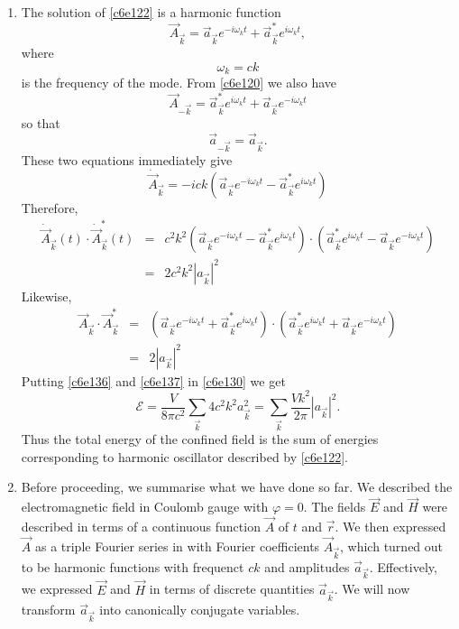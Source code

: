 \begin{enumerate}
\item The solution of \eqref{c6e122} is a harmonic function
\begin{equation}\label{c6e131}
\vec{A}_{\vec{k}} = \vec{a}_{\vec{k}}e^{-i\omega_k t} + \vec{a}_{\vec{k}}^\ast e^{i\omega_k t},
\end{equation}
where
\begin{equation}\label{c6e132}
\omega_k = ck
\end{equation}
is the frequency of the mode. From \eqref{c6e120} we also have
\begin{equation}\label{c6e133}
\vec{A}_{-\vec{k}} = \vec{a}_{\vec{k}}^\ast e^{i\omega_k t} + \vec{a}_{\vec{k}} e^{-i\omega_k t}
\end{equation}
so that
\begin{equation}\label{c6e134}
\vec{a}_{-\vec{k}} = \vec{a}_{\vec{k}}.
\end{equation}
These two equations immediately give
\begin{equation}\label{c6e135}
\dot{\vec{A}}_{\vec{k}} = -ick(\vec{a}_{\vec{k}}e^{-i\omega_k t} - \vec{a}_{\vec{k}}^\ast e^{i\omega_k t})
\end{equation}
Therefore,
\begin{eqnarray}
\dot{\vec{A}}_{\vec{k}}(t)\cdot\dot{\vec{A}}_{\vec{k}}^\ast(t) &=& c^2k^2
(\vec{a}_{\vec{k}}e^{-i\omega_k t} - \vec{a}_{\vec{k}}^\ast e^{i\omega_k t})\cdot
(\vec{a}_{\vec{k}}^\ast e^{i\omega_k t} - \vec{a}_{\vec{k}} e^{-i\omega_k t}) \nonumber \\
&=& 2c^2k^2|a_{\vec{k}}|^2 \label{c6e136}
\end{eqnarray}
Likewise,
\begin{eqnarray}
\vec{A}_{\vec{k}}\cdot\vec{A}_{\vec{k}}^\ast &=& 
(\vec{a}_{\vec{k}}e^{-i\omega_k t} + \vec{a}_{\vec{k}}^\ast e^{i\omega_k t})\cdot
(\vec{a}_{\vec{k}}^\ast e^{i\omega_k t} + \vec{a}_{\vec{k}} e^{-i\omega_k t}) \nonumber \\
&=& 2|a_{\vec{k}}|^2 \label{c6e137}
\end{eqnarray}
Putting \eqref{c6e136} and \eqref{c6e137} in \eqref{c6e130} we get
\begin{equation}\label{c6e138}
\mathcal{E} = \frac{V}{8\pi c^2}\sum_{\vec{k}} 4c^2k^2 a^2_{\vec{k}}
= \sum_{\vec{k}} \frac{Vk^2}{2\pi}|a_{\vec{k}}|^2.
\end{equation}
Thus the total energy of the confined field is the sum of energies corresponding
to harmonic oscillator described by \eqref{c6e122}.

\item Before proceeding, we summarise what we have done so far. We described the
electromagnetic field in Coulomb gauge with $\varphi = 0$. The fields $\vec{E}$ 
and $\vec{H}$ were described in terms of a continuous function $\vec{A}$ of $t$
and $\vec{r}$. We then expressed $\vec{A}$ as a triple Fourier series in with
Fourier coefficients $\vec{A}_{\vec{k}}$, which turned out to be harmonic functions
with frequenct $ck$ and amplitudes $\vec{a}_{\vec{k}}$. Effectively, we expressed
$\vec{E}$ and $\vec{H}$ in terms of discrete quantities $\vec{a}_{\vec{k}}$. We will
now transform $\vec{a}_{\vec{k}}$ into canonically conjugate variables.


\end{enumerate}
